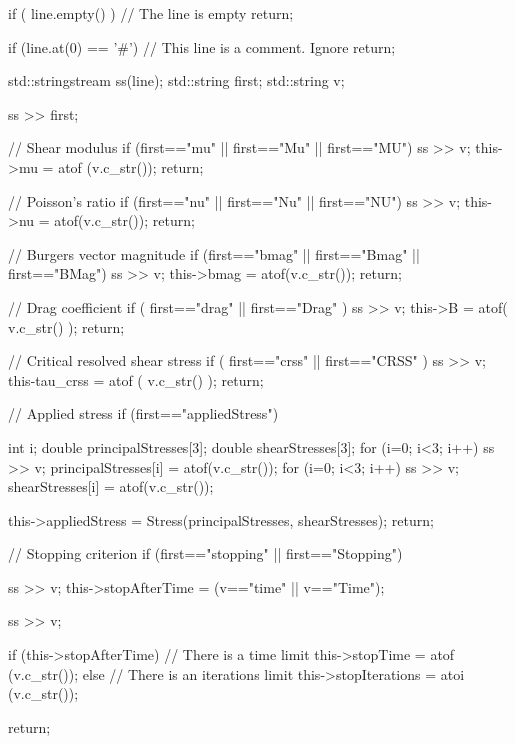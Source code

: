 \begin{DoxyCode}
{
    if ( line.empty() )
    {
        // The line is empty
        return;
    }

    if (line.at(0) == '#')
    {
        // This line is a comment. Ignore
        return;
    }

    std::stringstream ss(line);
    std::string first;
    std::string v;

    ss >> first;

    // Shear modulus
    if (first=="mu" || first=="Mu" || first=="MU")
    {
        ss >> v;
        this->mu = atof (v.c_str());
        return;
    }

    // Poisson's ratio
    if (first=="nu" || first=="Nu" || first=="NU")
    {
        ss >> v;
        this->nu = atof(v.c_str());
        return;
    }

    // Burgers vector magnitude
    if (first=="bmag" || first=="Bmag" || first=="BMag")
    {
        ss >> v;
        this->bmag = atof(v.c_str());
        return;
    }

    // Drag coefficient
    if ( first=="drag" || first=="Drag" )
    {
        ss >> v;
        this->B = atof( v.c_str() );
        return;
    }

    // Critical resolved shear stress
    if ( first=="crss" || first=="CRSS" )
    {
        ss >> v;
        this-tau_crss = atof ( v.c_str() );
        return;
    }

    // Applied stress
    if (first=="appliedStress")
    {
        int i;
        double principalStresses[3];
        double shearStresses[3];
        for (i=0; i<3; i++)
        {
            ss >> v;
            principalStresses[i] = atof(v.c_str());
        }
        for (i=0; i<3; i++)
        {
            ss >> v;
            shearStresses[i] = atof(v.c_str());
        }

        this->appliedStress = Stress(principalStresses, shearStresses);
        return;
    }

    // Stopping criterion
    if (first=="stopping" || first=="Stopping")
    {
      ss >> v;
      this->stopAfterTime = (v=="time" || v=="Time");

      ss >> v;

      if (this->stopAfterTime)
      {
          // There is a time limit
          this->stopTime = atof (v.c_str());
      }
      else
      {
          // There is an iterations limit
          this->stopIterations = atoi (v.c_str());
      }

      return;
    }

}
\end{DoxyCode}
